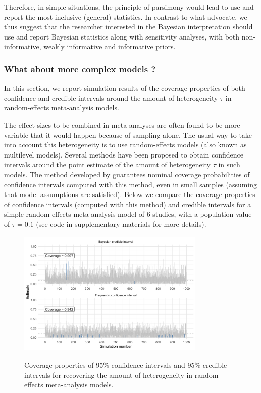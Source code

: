 \documentclass[a4paper,man,natbib,floatsintext,donotrepeattitle]{apa6}
\begin{document}
Therefore, in simple situations, the principle of parsimony would lead to use and report the most inclusive (general) statistics. In contrast to what \cite{albers_credible_2018} advocate, we thus suggest that the researcher interested in the Bayesian interpretation should use and report Bayesian statistics along with sensitivity analyses, with both non-informative, weakly informative and informative priors.

\subsubsection{What about more complex models ?}

In this section, we report simulation results of the coverage properties of both confidence and credible intervals around the amount of heterogeneity $\tau$ in random-effects meta-analysis models.

The effect sizes to be combined in meta-analyses are often found to be more variable that it would happen because of sampling alone. The usual way to take into account this heterogeneity is to use random-effects models (also known as multilevel models). Several methods have been proposed to obtain confidence intervals around the point estimate of the amount of heterogeneity $\tau$ in such models. The method developed by \cite{viechtbauer_confidence_2007} guarantees nominal coverage probabilities of confidence intervals computed with this method, even in small samples (assuming that model assumptions are satisfied). Below we compare the coverage properties of confidence intervals (computed with this method) and credible intervals for a simple random-effects meta-analysis model of 6 studies, with a population value of $\tau = 0.1$ (see code in supplementary materials for more details).

\begin{figure}[H]
  \caption{Coverage properties of 95\% confidence intervals and 95\% credible intervals for recovering the amount of heterogeneity in random-effects meta-analysis models.}
  \centering
  \includegraphics[width=0.8\textwidth]{coverage2.png}
  \label{fig:coverage2}
\end{figure}
\end{document}
